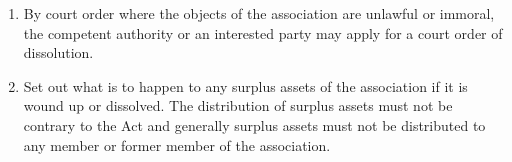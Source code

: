 \documentclass[english,a4paper,titlepage,oneside]{article}
\begin{document}
{\begin{enumerate}[label=Article \arabic*.,itemindent=*]
{\begin{enumerate}
      \item By court order where the objects of the association are unlawful or immoral, the competent authority or an interested party may apply for a court order of dissolution.
      \item Set out what is to happen to any surplus assets of the association if it is wound up or dissolved. The distribution of surplus assets must not be contrary to the Act and generally surplus assets must not be distributed to any member or former member of the association.
    \end{enumerate}
    } %
  \end{enumerate}
  }
\end{document}
